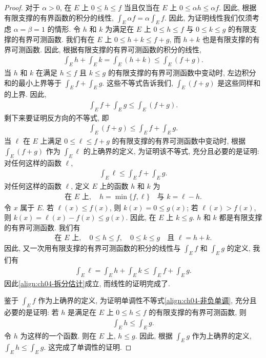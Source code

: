 \documentclass[../../main.tex]{subfiles}
\begin{document}
\begin{proof}
对于 $\alpha>0$, 在 $E$ 上 $0\leqslant h\leqslant f$ 当且仅当在 $E$ 上 $0\leqslant\alpha h\leqslant\alpha f$. 因此, 根据有限支撑的有界函数的积分的线性, $\int_{E}\alpha f=\alpha\int_{E}f$. 因此, 为证明线性我们仅须考虑 $\alpha=\beta=1$ 的情形. 令 $h$ 和 $k$ 为满足在 $E$ 上 $0\leqslant h\leqslant f$ 与 $0\leqslant k\leqslant g$ 的有限支撑的有界可测函数. 我们有在 $E$ 上 $0\leqslant h+k\leqslant f+g$, 而 $h+k$ 也是有限支撑的有界可测函数. 因此, 根据有限支撑的有界可测函数的积分的线性,
\begin{align*}
\int_{E}h+\int_{E}k=\int_{E}(h+k)\leqslant\int_{E}(f+g).
\end{align*}
当 $h$ 和 $k$ 在满足 $h\leqslant f$ 且 $k\leqslant g$ 的有限支撑的有界可测函数中变动时, 左边积分和的最小上界等于 $\int_{E}f+\int_{E}g$. 这些不等式告诉我们, $\int_{E}(f+g)$ 是这些同样和的上界. 因此,
\begin{align*}
\int_{E}f+\int_{E}g\leqslant\int_{E}(f+g).
\end{align*}
剩下来要证明反方向的不等式, 即
\begin{align*}
\int_{E}(f+g)\leqslant\int_{E}f+\int_{E}g.
\end{align*}
当 $\ell$ 在 $E$ 上满足 $0\leqslant\ell\leqslant f+g$ 的有限支撑的有界可测函数中变动时, 根据 $\int_{E}(f+g)$ 作为 $\int_{E}\ell$ 的上确界的定义, 为证明该不等式, 充分且必要的是证明: 对任何这样的函数 $\ell$,
\begin{align}
\int_{E}\ell\leqslant\int_{E}f+\int_{E}g.\label{align:ch04-拆分估计}
\end{align}
对任何这样的函数 $\ell$, 定义 $E$ 上的函数 $h$ 和 $k$ 为
\begin{align*}
\text{在 }E\text{ 上},\quad h=\min\{f,\ell\}\quad\text{与 }k=\ell-h.
\end{align*}
令 $x$ 属于 $E$. 若 $\ell(x)\leqslant f(x)$, 则 $k(x)=0\leqslant g(x)$; 若 $\ell(x)>f(x)$, 则 $k(x)=\ell(x)-f(x)\leqslant g(x)$. 因此, 在 $E$ 上 $k\leqslant g$. $h$ 和 $k$ 都是有限支撑的有界可测函数. 我们有
\begin{align*}
\text{在 }E\text{ 上},\quad 0\leqslant h\leqslant f,\quad 0\leqslant k\leqslant g\quad\text{且 }\ell=h+k.
\end{align*}
因此, 又一次用有限支撑的有界可测函数的积分的线性与 $\int_{E}f$ 和 $\int_{E}g$ 的定义, 我们有
\begin{align*}
\int_{E}\ell=\int_{E}h+\int_{E}k\leqslant\int_{E}f+\int_{E}g.
\end{align*}
因此\eqref{align:ch04-拆分估计}成立, 而线性的证明完成了.

鉴于 $\int_{E}f$ 作为上确界的定义, 为证明单调性不等式\eqref{align:ch04-非负单调}, 充分且必要的是证明: 若 $h$ 是满足在 $E$ 上 $0\leqslant h\leqslant f$ 的有限支撑的有界可测函数, 则
\begin{align}
\int_{E}h\leqslant\int_{E}g.\label{align:ch04-单调证明}
\end{align}
令 $h$ 为这样的一个函数. 则在 $E$ 上, $h\leqslant g$. 因此, 根据 $\int_{E}g$ 作为上确界的定义, $\int_{E}h\leqslant\int_{E}g$. 这完成了单调性的证明.
\end{proof}
\end{document}
